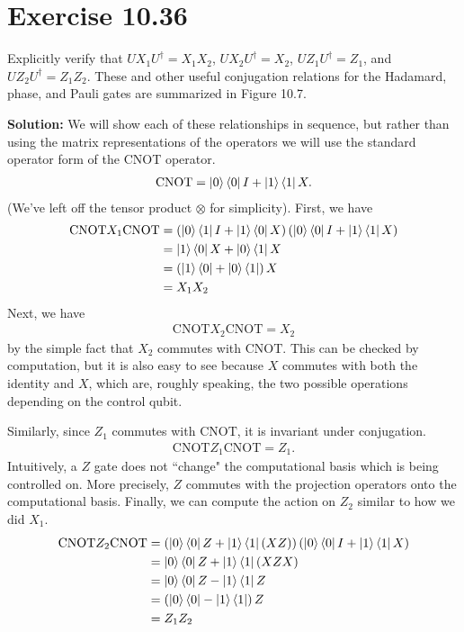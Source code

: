 \documentclass{book}
\begin{document}
\section*{Exercise 10.36}
    Explicitly verify that $U X_1 U^\dagger= X_1 X_2$, $U X_2 U^\dagger = X_2$, $U Z_1 U^\dagger = Z_1$, and $U Z_2 U^\dagger = Z_1 Z_2$. These and other useful conjugation relations for the Hadamard, phase, and Pauli gates are summarized in Figure 10.7.
    
    \textbf{Solution:} We will show each of these relationships in sequence, but rather than using the matrix representations of the operators we will use the standard operator form of the CNOT operator.
    \begin{align}
        \text{CNOT} = \ket{0}\bra{0}I + \ket{1}\bra{1}X.
    \end{align} 
    (We've left off the tensor product $\otimes$ for simplicity).  First, we have
    \begin{align}
    \begin{aligned}
        \text{CNOT}X_1 \text{CNOT} &= \left(\ket{0}\bra{1}I  + \ket{1}\bra{0}X\right)\left(\ket{0}\bra{0}I + \ket{1}\bra{1} X\right) \\
        &=\ket{1}\bra{0} X + \ket{0}\bra{1}X \\
        &=\left(\ket{1}\bra{0}+\ket{0}\bra{1}\right) X \\
        &= X_1 X_2
    \end{aligned}
    \end{align}
    Next, we have
    \begin{align}
        \text{CNOT} X_2 \text{CNOT} = X_2
    \end{align}
    by the simple fact that $X_2$ commutes with $\text{CNOT}$. This can be checked by computation, but it is also easy to see because $X$ commutes with both the identity and $X$, which are, roughly speaking, the two possible operations depending on the control qubit.
    
    Similarly, since $Z_1$ commutes with $\text{CNOT}$, it is invariant under conjugation.
    \begin{align}
        \text{CNOT} Z_1 \text{CNOT} = Z_1.
    \end{align}
    Intuitively, a $Z$ gate does not ``change" the computational basis which is being controlled on. More precisely, $Z$ commutes with the projection operators onto the computational basis. Finally, we can compute the action on $Z_2$ similar to how we did $X_1$.
    \begin{align}
    \begin{aligned}
        \text{CNOT} Z_2 \text{CNOT} &= \left(\ket{0}\bra{0}Z + \ket{1}\bra{1}(XZ)\right)\left(\ket{0}\bra{0}I + \ket{1}\bra{1}X\right) \\
        &= \ket{0}\bra{0}Z + \ket{1}\bra{1}(XZX) \\
        &= \ket{0}\bra{0}Z -\ket{1}\bra{1}Z \\
        &= \left(\ket{0}\bra{0}-\ket{1}\bra{1}\right) Z \\
        &= Z_1 Z_2
    \end{aligned}
    \end{align}
    
\end{document}
